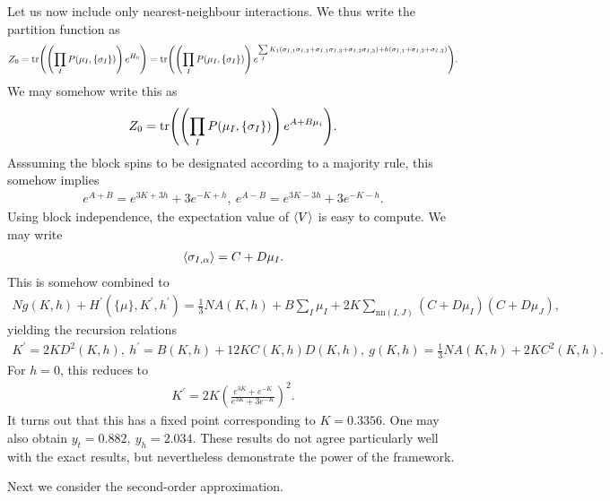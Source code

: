 Let us now include only nearest-neighbour interactions. We thus write the partition function as
\begin{align*}
	Z_{0} = \tr(\left(\prod\limits_{I}P(\mu_{I}, \{\sigma_{I}\})\right)e^{H_{0}}) = \tr(\left(\prod\limits_{I}P(\mu_{I}, \{\sigma_{I}\})\right)e^{\sum\limits_{I}K_{1}(\sigma_{I, 1}\sigma_{I, 2} + \sigma_{I, 1}\sigma_{I, 3} + \sigma_{I, 2}\sigma_{I, 3}) + h(\sigma_{I, 1} + \sigma_{I, 2} + \sigma_{I, 3})}).
\end{align*}
We may somehow write this as
\begin{align*}
	Z_{0} = \tr(\left(\prod\limits_{I}P(\mu_{I}, \{\sigma_{I}\})\right)e^{A + B\mu_{i}}).
\end{align*}
Asssuming the block spins to be designated according to a majority rule, this somehow implies
\begin{align*}
	e^{A + B} = e^{3K + 3h} + 3e^{-K + h},\ e^{A - B} = e^{3K - 3h} + 3e^{-K - h}.
\end{align*}
Using block independence, the expectation value of $\expval{V}$ is easy to compute. We may write
\begin{align*}
	\expval{\sigma_{I, \alpha}} = C + D\mu_{I}.
\end{align*}
This is somehow combined to
\begin{align*}
	Ng(K, h) + H^{\prime}(\{\mu\}, K^{\prime}, h^{\prime}) = \frac{1}{3}NA(K, h) + B\sum\limits_{I}\mu_{I} + 2K\sum\limits_{\text{nn}(I, J)}(C + D\mu_{I})(C + D\mu_{J}),
\end{align*}
yielding the recursion relations
\begin{align*}
	K^{\prime} = 2KD^{2}(K, h),\ h^{\prime} = B(K, h) + 12KC(K, h)D(K, h),\ g(K, h) = \frac{1}{3}NA(K, h) + 2KC^{2}(K, h).
\end{align*}
For $h = 0$, this reduces to
\begin{align*}
	K^{\prime} = 2K\left(\frac{e^{3K} + e^{-K}}{e^{3K} + 3e^{-K}}\right)^{2}.
\end{align*}
It turns out that this has a fixed point corresponding to $K = 0.3356$. One may also obtain $y_{t} = 0.882,\ y_{h} = 2.034$. These results do not agree particularly well with the exact results, but nevertheless demonstrate the power of the framework.

Next we consider the second-order approximation.